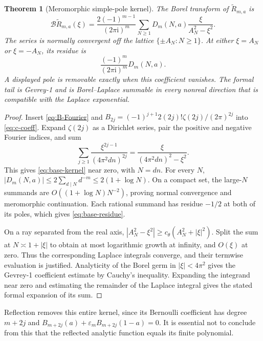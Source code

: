 \documentclass[11pt,a4paper]{article}
\numberwithin{equation}{section}
\newtheorem{theorem}{Theorem}[section]
\theoremstyle{definition}\newtheorem{definition}[theorem]{Definition}
\theoremstyle{remark}\newtheorem{remark}[theorem]{Remark}
\newcommand{\ii}{\mathrm i}\newcommand{\e}{\mathrm e}
\newcommand{\B}{\mathcal B}\newcommand{\Sp}{\mathcal S_+}
\newcommand{\eps}{\varepsilon}\newcommand{\muh}{\widehat\mu}
\begin{document}
\begin{theorem}[Meromorphic simple-pole kernel]\label{thm:base-borel}
The Borel transform of $\widetilde R_{m,a}$ is
\begin{equation}
 \B\widetilde R_{m,a}(\xi)=
 \frac{2(-1)^{m-1}}{(2\pi\ii)^m}
 \sum_{N\ge1}D_m(N,a)\frac{\xi}{A_N^2-\xi^2}.
 \label{eq:base-kernel}
\end{equation}
The series is normally convergent off the lattice $\{\pm A_N:N\ge1\}$.
At either $\xi=A_N$ or $\xi=-A_N$, its residue is
\begin{equation}
 \frac{(-1)^m}{(2\pi\ii)^m}D_m(N,a).
 \label{eq:base-residue}
\end{equation}
A displayed pole is removable exactly when this coefficient vanishes.
The formal tail is Gevrey-1 and is Borel--Laplace summable in every
nonreal direction that is compatible with the Laplace exponential.
\end{theorem}
\begin{proof}
Insert \eqref{eq:B-Fourier} and
$B_{2j}=(-1)^{j+1}2(2j)!\zeta(2j)/(2\pi)^{2j}$ into
\eqref{eq:c-coeff}. Expand $\zeta(2j)$ as a Dirichlet series, pair the
positive and negative Fourier indices, and sum
\[
 \sum_{j\ge1}\frac{\xi^{2j-1}}{(4\pi^2dn)^{2j}}
                  =\frac{\xi}{(4\pi^2dn)^2-\xi^2}.
\]
This gives \eqref{eq:base-kernel} near zero, with $N=dn$.
For every $N$, $|D_m(N,a)|\le2\sum_{d\mid N}d^{-m}
\le2(1+\log N)$. On a compact set, the large-$N$ summands are
$O((1+\log N)N^{-2})$, proving normal convergence and meromorphic
continuation. Each rational summand has residue $-1/2$ at both of its
poles, which gives \eqref{eq:base-residue}.

On a ray separated from the real axis,
$|A_N^2-\xi^2|\ge c_\theta(A_N^2+|\xi|^2)$.
Split the sum at $N\asymp1+|\xi|$ to obtain at most logarithmic growth
at infinity, and $O(\xi)$ at zero. Thus the corresponding Laplace
integrals converge, and their termwise evaluation is justified.
Analyticity of the Borel germ in $|\xi|<4\pi^2$ gives the Gevrey-1
coefficient estimate by Cauchy's inequality. Expanding the integrand
near zero and estimating the remainder of the Laplace integral gives
the stated formal expansion of its sum.
\end{proof}

Reflection removes this entire kernel, since its Bernoulli coefficient
has degree $m+2j$ and
$B_{m+2j}(a)+\eps_m B_{m+2j}(1-a)=0$.
It is essential not to conclude from this that the reflected analytic
function equals its finite polynomial.
\end{document}

